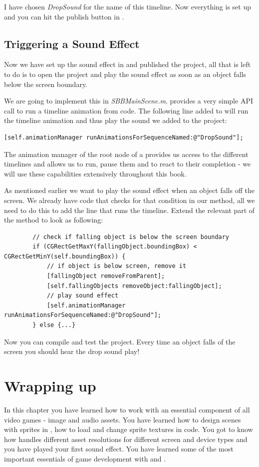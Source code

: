 I have chosen \textit{DropSound} for the name of this timeline. Now everything
is set up and you can hit the publish button in \SB{}.

\subsection{Triggering a Sound Effect}
Now we have set up the sound effect in \SB{} and published the project, all that
is left to do is to open the \xcode{} project and play the sound effect as soon
as an object falls below the screen boundary.

We are going to implement this in \textit{SBBMainScene.m}. \cocos{} provides a
very simple API call to run a timeline animation from code. The following line
added to  will run the timeline animation and thus play the
sound we added to the project:
\begin{lstlisting}
[self.animationManager runAnimationsForSequenceNamed:@"DropSound"];
\end{lstlisting}
The animation manager of the root node of a \ccbfile{} provides us access to the
different timelines and allows us to run, pause them and to react to their
completion - we will use these capabilities extensively throughout this book.

As mentioned earlier we want to play the sound effect when an object falls off
the screen. We already have code that checks for that condition in our
 method, all we need to do this to add the line that runs the
timeline. Extend the relevant part of the  method to look as
following:
\begin{lstlisting}
        // check if falling object is below the screen boundary
        if (CGRectGetMaxY(fallingObject.boundingBox) < CGRectGetMinY(self.boundingBox)) {
            // if object is below screen, remove it
            [fallingObject removeFromParent];
            [self.fallingObjects removeObject:fallingObject];
            // play sound effect
            [self.animationManager runAnimationsForSequenceNamed:@"DropSound"];
        } else {...}
\end{lstlisting}
Now you can compile and test the project. Every time an object falls of the
screen you should hear the drop sound play!
\section{Wrapping up}
In this chapter you have learned how to work with an essential component of all
video games - image and audio assets. You have learned how to design scenes with
sprites in \SB{}, how to load and change sprite textures in code. You got to
know how \SB{} handles different asset resolutions for different screen and
device types and you have played your first sound effect. You have learned some
of the most important essentials of game development with \SB{} and \cocos{}.

